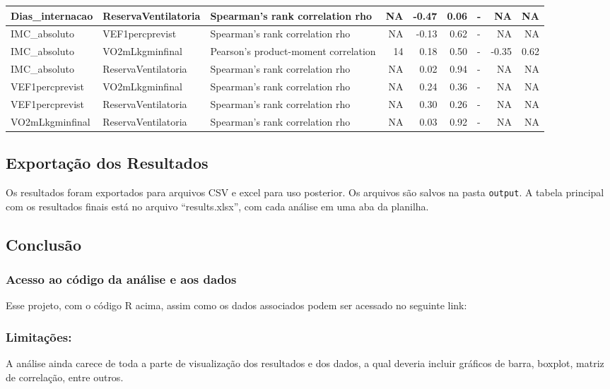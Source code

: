 \documentclass[
]{article}
\begin{document}
\begin{tabular}{l|l|l|r|r|r|l|r|r}
\hline
Dias\_internacao & ReservaVentilatoria & Spearman's rank correlation rho & NA & -0.47 & 0.06 & - & NA & NA\\
\hline
IMC\_absoluto & VEF1percprevist & Spearman's rank correlation rho & NA & -0.13 & 0.62 & - & NA & NA\\
\hline
IMC\_absoluto & VO2mLkgminfinal & Pearson's product-moment correlation & 14 & 0.18 & 0.50 & - & -0.35 & 0.62\\
\hline
IMC\_absoluto & ReservaVentilatoria & Spearman's rank correlation rho & NA & 0.02 & 0.94 & - & NA & NA\\
\hline
VEF1percprevist & VO2mLkgminfinal & Spearman's rank correlation rho & NA & 0.24 & 0.36 & - & NA & NA\\
\hline
VEF1percprevist & ReservaVentilatoria & Spearman's rank correlation rho & NA & 0.30 & 0.26 & - & NA & NA\\
\hline
VO2mLkgminfinal & ReservaVentilatoria & Spearman's rank correlation rho & NA & 0.03 & 0.92 & - & NA & NA\\
\hline
\end{tabular}

\hypertarget{exportauxe7uxe3o-dos-resultados}{%
\subsection{Exportação dos
Resultados}\label{exportauxe7uxe3o-dos-resultados}}

Os resultados foram exportados para arquivos CSV e excel para uso
posterior. Os arquivos são salvos na pasta \texttt{output}. A tabela
principal com os resultados finais está no arquivo ``results.xlsx'', com
cada análise em uma aba da planilha.

\hypertarget{conclusuxe3o}{%
\subsection{Conclusão}\label{conclusuxe3o}}

\hypertarget{acesso-ao-cuxf3digo-da-anuxe1lise-e-aos-dados}{%
\subsubsection{Acesso ao código da análise e aos
dados}\label{acesso-ao-cuxf3digo-da-anuxe1lise-e-aos-dados}}

Esse projeto, com o código R acima, assim como os dados associados podem
ser acessado no seguinte link:

\hypertarget{limitauxe7uxf5es}{%
\subsubsection{Limitações:}\label{limitauxe7uxf5es}}

A análise ainda carece de toda a parte de visualização dos resultados e
dos dados, a qual deveria incluir gráficos de barra, boxplot, matriz de
correlação, entre outros.
\end{document}
